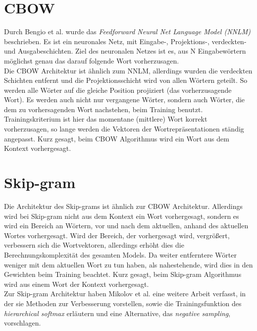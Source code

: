 \documentclass[12pt,a4paper]{report}
\begin{document}
\section*{CBOW}
Durch  Bengio et al. \cite{bengio2003neural} wurde das \textit{Feedforward Neural Net Language Model (NNLM)} beschrieben. Es ist ein neuronales Netz, mit Eingabe-, Projektions-, verdeckten- und Ausgabeschichten. Ziel des neuronalen Netzes ist es, aus N Eingabewörtern möglichst genau das darauf folgende Wort vorherzusagen.\\
Die CBOW Architektur ist ähnlich zum NNLM, allerdings wurden die verdeckten Schichten entfernt und die Projektionsschicht wird von allen Wörtern geteilt. So werden alle Wörter auf die gleiche Position projiziert (das vorherzusagende Wort). Es werden auch nicht nur vergangene Wörter, sondern auch Wörter, die dem zu vorhersagenden Wort nachstehen, beim Training benutzt. Trainingskriterium ist hier das momentane (mittlere) Wort korrekt vorherzusagen, so lange werden die Vektoren der Wortrepräsentationen ständig angepasst. Kurz gesagt, beim CBOW Algorithmus wird ein Wort aus dem Kontext vorhergesagt.



\section*{Skip-gram}
Die Architektur des Skip-grams ist ähnlich zur CBOW Architektur. Allerdings wird bei Skip-gram nicht aus dem Kontext ein Wort vorhergesagt, sondern es wird ein Bereich an Wörtern, vor und nach dem aktuellen, anhand des aktuellen Wortes vorhergesagt. Wird der Bereich, der vorhergesagt wird, vergrößert, verbessern sich die Wortvektoren, allerdings erhöht dies die Berechnungskomplexität des gesamten Models. Da weiter entferntere Wörter weniger mit dem aktuellen Wort zu tun haben, als nahestehende, wird dies in den Gewichten beim Training beachtet\citep{DBLP:journals/corr/abs-1301-3781}. Kurz gesagt, beim Skip-gram Algorithmus wird aus einem Wort der Kontext vorhergesagt.\\

Zur Skip-gram Architektur haben Mikolov et al. \citep{DBLP:journals/corr/MikolovSCCD13} eine weitere Arbeit verfasst, in der sie Methoden zur Verbesserung vorstellen, sowie die Trainingsfunktion des \textit{hierarchical softmax} erläutern und eine Alternative, das \textit{negative sampling}, vorschlagen.\\
\end{document}
